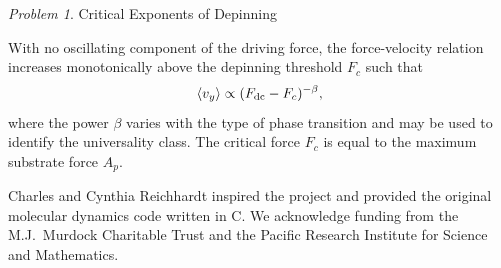 \documentclass[preprint,showpacs,preprintnumbers,amsmath,amssymb,aps,prb]{revtex4-1}
\theoremstyle{remark}
\newtheorem{problem}{Problem}
\begin{document}
 \begin{problem}{Critical Exponents of Depinning}
   \label{ex:critical}
 
   \noindent
   With no oscillating component of the driving force,
  the force-velocity relation increases monotonically 
  above the depinning threshold $F_c$ such that
  \begin{equation}
    \langle v_y \rangle \propto (F_{\rm dc}-F_c)^{-\beta},
  \end{equation}
  where the power $\beta$ varies with the
  type of phase transition and 
  may 
  be used to identify the universality class.\cite{Reichhardt2017} 
  The critical force $F_c$ is equal to the maximum substrate force
  $A_p$.

  \end{problem}

\begin{acknowledgments}
Charles and Cynthia Reichhardt
  inspired the project and
  provided the original molecular dynamics code
  written in  C.
  We acknowledge funding from the M.J.\ Murdock Charitable Trust
  and the Pacific Research Institute for Science and Mathematics.

\end{acknowledgments}
 
\end{document}
